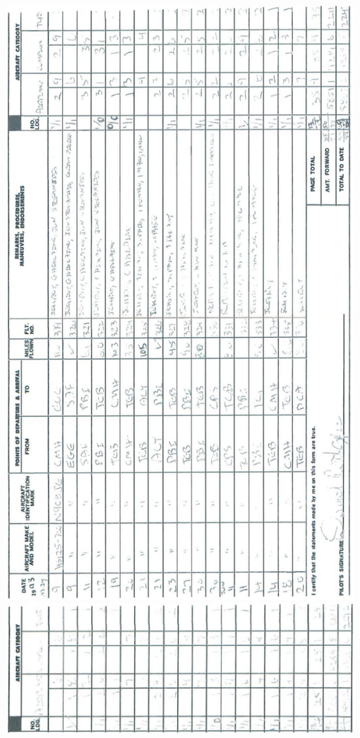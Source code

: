 \documentclass[10pt]{article}
\begin{document}
\includegraphics[max width=\textwidth, center]{2025_02_27_dd68c3d38de88f0516d9g-023}\\
\includegraphics[max width=\textwidth, center]{2025_02_27_dd68c3d38de88f0516d9g-024}\\
\end{document}
